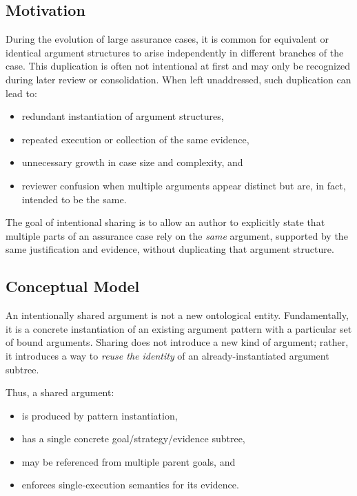 \documentclass[12pt,twoside,a4paper]{article}
\begin{document}
\subsection{Motivation}

During the evolution of large assurance cases, it is common for equivalent or identical argument structures to arise independently in different branches of the case. This duplication is often not intentional at first and may only be recognized during later review or consolidation. When left unaddressed, such duplication can lead to:

\begin{itemize}
  \item redundant instantiation of argument structures,
  \item repeated execution or collection of the same evidence,
  \item unnecessary growth in case size and complexity, and
  \item reviewer confusion when multiple arguments appear distinct but are, in fact, intended to be the same.
\end{itemize}

The goal of intentional sharing is to allow an author to explicitly state that multiple parts of an assurance case rely on the \emph{same} argument, supported by the same justification and evidence, without duplicating that argument structure.

\subsection{Conceptual Model}

An intentionally shared argument is not a new ontological entity. Fundamentally, it is a concrete instantiation of an existing argument pattern with a particular set of bound arguments. Sharing does not introduce a new kind of argument; rather, it introduces a way to \emph{reuse the identity} of an already-instantiated argument subtree.

Thus, a shared argument:
\begin{itemize}
  \item is produced by pattern instantiation,
  \item has a single concrete goal/strategy/evidence subtree,
  \item may be referenced from multiple parent goals, and
  \item enforces single-execution semantics for its evidence.
\end{itemize}
\end{document}

